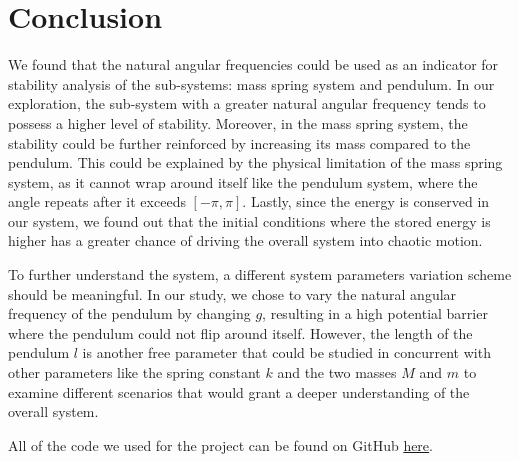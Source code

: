 \documentclass[12pt]{article}
\begin{document}
\section{Conclusion}
We found that the natural angular frequencies could be used as an indicator for stability analysis of the sub-systems: mass spring system and pendulum. In our exploration, the sub-system with a greater natural angular frequency tends to possess a higher level of stability. Moreover, in the mass spring system, the stability could be further reinforced by increasing its mass compared to the pendulum. This could be explained by the physical limitation of the mass spring system, as it cannot wrap around itself like the pendulum system, where the angle repeats after it exceeds $[-\pi, \pi]$. Lastly, since the energy is conserved in our system, we found out that the initial conditions where the stored energy is higher has a greater chance of driving the overall system into chaotic motion.

To further understand the system, a different system parameters variation scheme should be meaningful. In our study, we chose to vary the natural angular frequency of the pendulum by changing $g$, resulting in a high potential barrier where the pendulum could not flip around itself. However, the length of the pendulum $l$ is another free parameter that could be studied in concurrent with other parameters like the spring constant $k$ and the two masses $M$ and $m$ to examine different scenarios that would grant a deeper understanding of the overall system.

All of the code we used for the project can be found on GitHub \href{https://github.com/NextZtepS/SpringedCart_and_Pendulum/tree/main}{here}.
\end{document}
